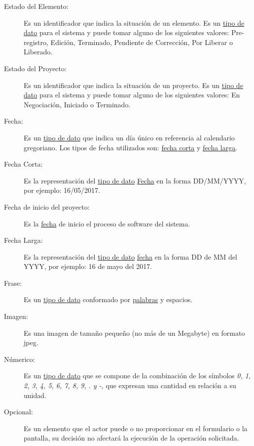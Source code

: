 \begin{description}
	\item[\hypertarget{tEdoElem}{Estado del Elemento:}] Es un identificador que indica la situación de un elemento. Es un \hyperlink{tTipoDato}{tipo de dato} para el sistema y puede tomar alguno de los siguientes valores: Pre-registro, Edición, Terminado, Pendiente de Corrección, Por Liberar o Liberado.
	
	\item[\hypertarget{tEdoProy}{Estado del Proyecto:}] Es un identificador que indica la situación de un proyecto. Es un \hyperlink{tTipoDato}{tipo de dato} para el sistema y puede tomar alguno de los siguientes valores: En Negociación, Iniciado o Terminado.
	
	\item[\hypertarget{tFecha}{Fecha:}] Es un \hyperlink{tTipoDato}{tipo de dato} que indica un día único en referencia al calendario gregoriano. Los tipos de fecha utilizados son: \hyperlink{tFechaCorta}{fecha corta} y \hyperlink{tFechaLarga}{fecha larga}.
	
	\item[\hypertarget{tFechaCorta}{Fecha Corta:}] Es la representación del \hyperlink{tTipoDato}{tipo de dato} \hyperlink{tFecha}{Fecha} en la forma DD/MM/YYYY, por ejemplo: 16/05/2017.
	
	\item[\hypertarget{tFechaInitPro}{Fecha de inicio del proyecto:}] Es la \hyperlink{tFecha}{fecha} de inicio el proceso de software del sistema.
	
	\item[\hypertarget{tFechaLarga}{Fecha Larga:}] Es la representación del \hyperlink{tTipoDato}{tipo de dato} \hyperlink{tFecha}{fecha} en la forma DD de MM del YYYY, por ejemplo: 16 de mayo del 2017.
	
	\item[\hypertarget{tFrase}{Frase:}] Es un \hyperlink{tTipoDato}{tipo de dato} conformado por \hyperlink{tPalabra}{palabras} y espacios.
	
	\item[\hypertarget{tImagen}{Imagen:}] Es una imagen de tamaño pequeño (no más de un Megabyte) en formato jpeg.
	
	\item[\hypertarget{tNumerico}{Númerico:}] Es un \hyperlink{tTipoDato}{tipo de dato} que se compone de la combinación de los símbolos {\em 0, 1, 2, 3, 4, 5, 6, 7, 8, 9, . y -}, que expresan una cantidad en relación a su unidad.
	
	\item[\hypertarget{tOpcional}{Opcional:}] Es un elemento que el actor puede o no proporcionar en el formulario o la pantalla, su decisión no afectará la ejecución de la operación solicitada.
	

\end{description}
